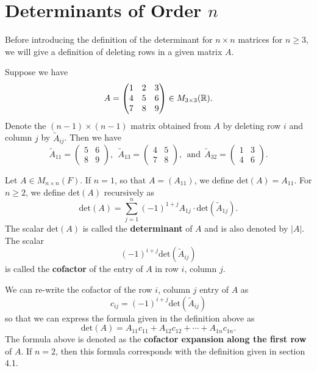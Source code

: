 \section{Determinants of Order \( n \)}

Before introducing the definition of the determinant for \( n \times n  \) matrices for \( n  \geq 3 \), we will give a definition of deleting rows in a given matrix \( A  \).

Suppose we have 
\[  A = \begin{pmatrix} 
    1 & 2 & 3 \\
    4 &  5 & 6 \\ 
    7 & 8 & 9 
          \end{pmatrix}  \in {M}_{3 \times 3 }(\mathbb{R}). \]
          Denote the \( (n-1) \times (n-1) \) matrix obtained from \( A \) by deleting row \( i  \) and column \( j  \) by \( \tilde{A}_{ij} \). Then we have
          \[  \tilde{A}_{11} = \begin{pmatrix} 
              5 & 6 \\
              8 & 9 
                    \end{pmatrix} , \ \ {\tilde{A}}_{13} = \begin{pmatrix}
              4 & 5 \\
              7 & 8 
          \end{pmatrix}, \ \ \text{and} \ \ {\tilde{A}}_{32} = \begin{pmatrix} 
              1 & 3 \\
              4 & 6 
                    \end{pmatrix}.   \]

\begin{definition}
    Let \( A \in {M}_{n \times n}(F)  \). If \( n =1  \), so that \( A = ({A}_{11}) \), we define \( \text{det}(A) = {A}_{11}  \). For \( n \geq 2  \), we define \( \text{det}(A) \) recursively as 
    \[  \text{det}(A) = \sum_{ j=1  }^{  n } (-1)^{1 + j} {A}_{1j} \cdot \text{det}(\tilde{A}_{1j}). \]
    The scalar \( \text{det}(A) \) is called the \textbf{determinant} of \( A  \) and is also denoted by \( | A |  \). The scalar 
    \[ (-1)^{i + j} \text{det}(\tilde{A}_{ij})   \] is called the \textbf{cofactor} of the entry of \( A  \) in row \( i  \), column \( j  \).
\end{definition}
We can re-write the cofactor of the row \( i \), column \( j \) entry of \( A  \) as 
\[  {c}_{ij} = (-1)^{i+j} \text{det}(\tilde{A}_{ij}) \] so that we can express the formula given in the definition above as 
\[  \text{det}(A) = {A}_{11}{c}_{11} + {A}_{12} {c}_{12} + \cdots + {A}_{1n}{c}_{1n}. \]
The formula above is denoted as the \textbf{cofactor expansion along the first row} of \( A  \). If \(  n = 2  \), then this formula corresponds with the definition given in section 4.1.

